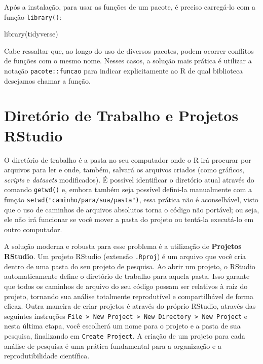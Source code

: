 \documentclass[
  12pt,
  letterpaper,
  DIV=11,
  numbers=noendperiod]{scrreprt}
\newenvironment{Shaded}{\begin{snugshade}}{\end{snugshade}}
\newcommand{\FunctionTok}[1]{\textcolor[rgb]{0.28,0.35,0.67}{#1}}
\newcommand{\NormalTok}[1]{\textcolor[rgb]{0.00,0.23,0.31}{#1}}
\theoremstyle{definition}
\theoremstyle{exemplo}
\begin{document}
Após a instalação, para usar as funções de um pacote, é preciso
carregá-lo com a função \texttt{library()}:

\begin{Shaded}
\begin{Highlighting}[]
\FunctionTok{library}\NormalTok{(tidyverse)}
\end{Highlighting}
\end{Shaded}

Cabe ressaltar que, ao longo do uso de diversos pacotes, podem ocorrer
conflitos de funções com o mesmo nome. Nesses casos, a solução mais
prática é utilizar a notação \texttt{pacote::funcao} para indicar
explicitamente ao R de qual biblioteca desejamos chamar a função.

\section{Diretório de Trabalho e Projetos
RStudio}\label{diretuxf3rio-de-trabalho-e-projetos-rstudio}

O diretório de trabalho é a pasta no seu computador onde o R irá
procurar por arquivos para ler e onde, também, salvará os arquivos
criados (como gráficos, \emph{scripts} e \emph{datasets} modificados). É
possível identificar o diretório atual através do comando
\texttt{getwd()} e, embora também seja possível defini-la manualmente
com a função \texttt{setwd("caminho/para/sua/pasta")}, essa prática não
é aconselhável, visto que o uso de caminhos de arquivos absolutos torna
o código não portável; ou seja, ele não irá funcionar se você mover a
pasta do projeto ou tentá-la executá-lo em outro computador.

A solução moderna e robusta para esse problema é a utilização de
\textbf{Projetos RStudio}. Um projeto RStudio (extensão \texttt{.Rproj})
é um arquivo que você cria dentro de uma pasta do seu projeto de
pesquisa. Ao abrir um projeto, o RStudio automaticamente define o
diretório de trabalho para aquela pasta. Isso garante que todos os
caminhos de arquivo do seu código possam ser relativos à raiz do
projeto, tornando sua análise totalmente reprodutível e compartilhável
de forma eficaz. Outra maneira de criar projetos é através do próprio
RStudio, através das seguintes instruções
\texttt{File\ \textgreater{}\ New\ Project\ \textgreater{}\ New\ Directory\ \textgreater{}\ New\ Project}
e nesta última etapa, você escolherá um nome para o projeto e a pasta de
sua pesquisa, finalizando em \texttt{Create\ Project}. A criação de um
projeto para cada análise de pesquisa é uma prática fundamental para a
organização e a reprodutibilidade científica.
\end{document}
